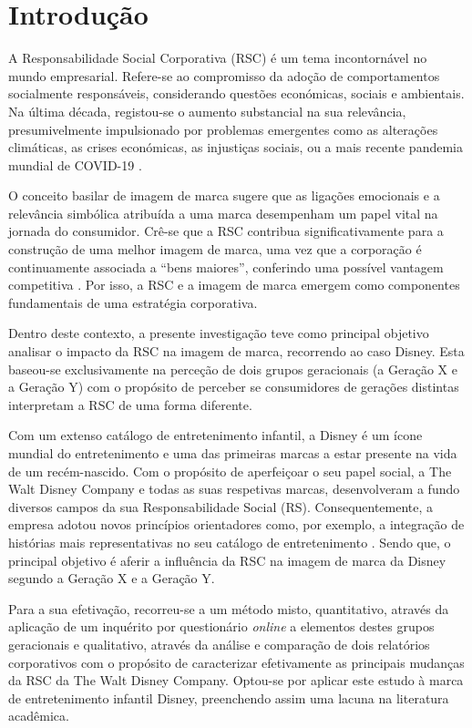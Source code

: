 \documentclass[portuguese]{textolivre}
\begin{document}
\section{Introdução}
A Responsabilidade Social Corporativa (RSC) é um tema incontornável no mundo empresarial. Refere-se ao compromisso da adoção de comportamentos socialmente responsáveis, considerando questões económicas, sociais e ambientais. Na última década, registou-se o aumento substancial na sua relevância, presumivelmente impulsionado por problemas emergentes como as alterações climáticas, as crises económicas, as injustiças sociais, ou a mais recente pandemia mundial de COVID-19 \cite{quezado_corporate_2022}. 

O conceito basilar de imagem de marca sugere que as ligações emocionais e a relevância simbólica atribuída a uma marca desempenham um papel vital na jornada do consumidor. Crê-se que a RSC contribua significativamente para a construção de uma melhor imagem de marca, uma vez que a corporação é continuamente associada a “bens maiores”, conferindo uma possível vantagem competitiva \cite{he_effect_2014,quezado_corporate_2022}.  Por isso, a RSC e a imagem de marca emergem como componentes fundamentais de uma estratégia corporativa. 

Dentro deste contexto, a presente investigação teve como principal objetivo analisar o impacto da RSC na imagem de marca, recorrendo ao caso Disney. Esta baseou-se exclusivamente na perceção de dois grupos geracionais (a Geração X e a Geração Y) com o propósito de perceber se consumidores de gerações distintas interpretam a RSC de uma forma diferente. 

Com um extenso catálogo de entretenimento infantil, a Disney é um ícone mundial do entretenimento e uma das primeiras marcas a estar presente na vida de um recém-nascido. Com o propósito de aperfeiçoar o seu papel social, a The Walt Disney Company e todas as suas respetivas marcas, desenvolveram a fundo diversos campos da sua Responsabilidade Social (RS). Consequentemente, a empresa adotou novos princípios orientadores como, por exemplo, a integração de histórias mais representativas no seu catálogo de entretenimento \cite{dubois_disney_2021}. Sendo que, o principal objetivo é aferir a influência da RSC na imagem de marca da Disney segundo a Geração X e a Geração Y. 

Para a sua efetivação, recorreu-se a um método misto, quantitativo, através da aplicação de um inquérito por questionário \textit{online} a elementos destes grupos geracionais e qualitativo, através da análise e comparação de dois relatórios corporativos com o propósito de caracterizar efetivamente as principais mudanças da RSC da The Walt Disney Company. Optou-se por aplicar este estudo à marca de entretenimento infantil Disney, preenchendo assim uma lacuna na literatura acadêmica.
\end{document}
